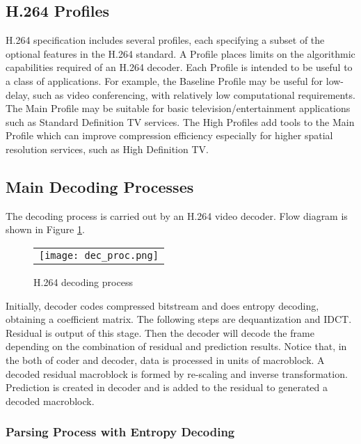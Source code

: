 \documentclass[../main.tex]{subfiles}
\begin{document}
\subsection{ H.264 Profiles}

H.264 specification includes several profiles, each specifying a subset of the optional features in the H.264 standard. A Profile places limits on the algorithmic capabilities
required of an H.264 decoder. Each Profile is intended to be useful to a class of
applications. For example, the Baseline Profile may be useful for low-delay, such as video conferencing, with relatively low computational requirements. The
Main Profile may be suitable for basic television/entertainment applications such as Standard
Definition TV services. The High Profiles add tools to the Main Profile which can improve compression efficiency especially for higher spatial resolution services, such as High Definition TV.



\subsection{ Main Decoding Processes }

The decoding process is carried out by an H.264 video decoder. Flow diagram is shown in Figure \ref{fig:decproc}.

\begin{figure} [ht]
\begin{center}
\begin{tabular}{c} %
\texttt{[image: dec\_proc.png]}
\end{tabular}
\end{center}
\caption[decproc] 
{ \label{fig:decproc} H.264 decoding process \cite{richardson2004h} }
\end{figure} 

Initially, decoder codes compressed bitstream and does entropy decoding, obtaining a coefficient matrix. The following steps are dequantization and IDCT. Residual is output of this stage. Then the decoder will decode the frame depending on the combination of residual and prediction results. Notice that, in the both of coder and decoder, data is processed in units of macroblock. A decoded residual macroblock is formed by re-scaling and inverse transformation. Prediction is created in decoder and is added to the residual to generated a decoded macroblock. 

\subsubsection{ Parsing Process with Entropy Decoding }
\end{document}

